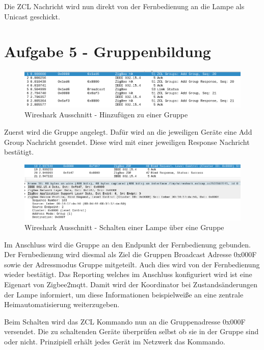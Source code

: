 Die ZCL Nachricht wird nun direkt von der Fernbedienung an die Lampe als Unicast geschickt.

\section{Aufgabe 5 - Gruppenbildung}

\begin{figure}[H]
    \centering
    \includegraphics[width=1\textwidth]{media/lsg-5-1.png}
    \caption{Wireshark Ausschnitt - Hinzufügen zu einer Gruppe}
\end{figure}

Zuerst wird die Gruppe angelegt. Dafür wird an die jeweiligen Geräte eine Add Group Nachricht gesendet. Diese wird mit einer jeweiligen Response
Nachricht bestätigt.

\begin{figure}[H]
    \centering
    \includegraphics[width=1\textwidth]{media/lsg-5-2.png}
    \caption{Wireshark Ausschnitt - Schalten einer Lampe über eine Gruppe}
\end{figure}

Im Anschluss wird die Gruppe an den Endpunkt der Fernbedienung gebunden. Der Fernbedienung wird diesmal als Ziel die Gruppen Broadcast Adresse
0x000F sowie der Adressmodus Gruppe mitgeteilt. Auch dies wird von der Fernbedienung wieder bestätigt. Das Reporting welches im Anschluss 
konfiguriert wird ist eine Eigenart von Zigbee2mqtt. Damit wird der Koordinator bei Zustandsänderungen der Lampe informiert, um diese Informationen
beispielweiße an eine zentrale Heimautomatisierung weiterzugeben.

Beim Schalten wird das ZCL Kommando nun an die Gruppenadresse 0x000F versendet. Die zu schaltenden Geräte überprüfen selbst ob sie in der Gruppe sind 
oder nicht. Prinzipiell erhält jedes Gerät im Netzwerk das Kommando.







